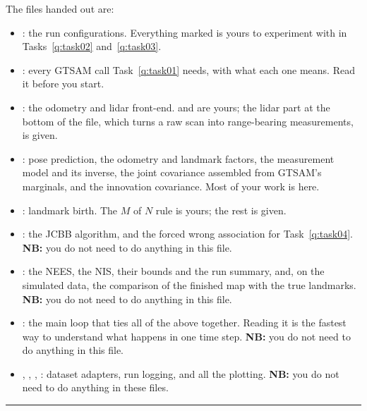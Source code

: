 \documentclass{exam}
\begin{document}
The files handed out are:
\begin{itemize}
	\item {}: the run configurations. Everything marked  is yours to experiment with in Tasks~\ref{q:task02} and~\ref{q:task03}.
	\item {}: every GTSAM call Task~\ref{q:task01} needs, with what each one means. Read it before you start.
	\item {}: the odometry and lidar front-end.  and  are yours; the lidar part at the bottom of the file, which turns a raw scan into range-bearing measurements, is given.
	\item {}: pose prediction, the odometry and landmark factors, the measurement model and its inverse, the joint covariance assembled from GTSAM's marginals, and the innovation covariance. Most of your work is here.
	\item {}: landmark birth. The \(M\) of \(N\) rule is yours; the rest is given.
	\item {}: the JCBB algorithm, and the forced wrong association for Task~\ref{q:task04}. \textbf{NB:} you do not need to do anything in this file.
	\item {}: the NEES, the NIS, their bounds and the run summary, and, on the simulated data, the comparison of the finished map with the true landmarks. \textbf{NB:} you do not need to do anything in this file.
	\item {}: the main loop that ties all of the above together. Reading it is the fastest way to understand what happens in one time step. \textbf{NB:} you do not need to do anything in this file.
	\item {}, , , : dataset adapters, run logging, and all the plotting. \textbf{NB:} you do not need to do anything in these files.
\end{itemize}

\rule{\textwidth}{0.4pt}

\begin{questions}
	\breaknoans \breakans
	
	
	\breaknoans
	
	\breaknoans
	
\end{questions}
\end{document}
